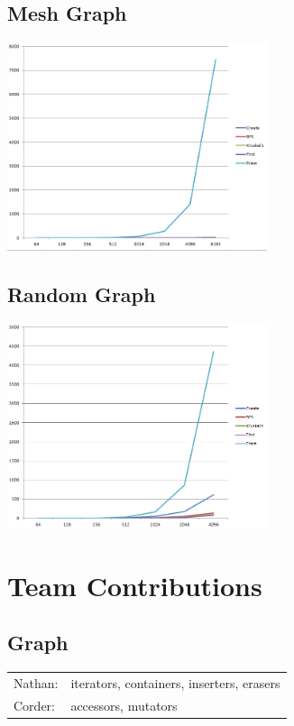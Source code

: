 \documentclass[titlepage]{article}
\newenvironment{Figure}
  {\par\medskip\noindent\minipage{\linewidth}}
  {\endminipage\par\medskip}
\begin{document}
\begin{multicols*}{2}
                \subsection{Mesh Graph}
                \begin{Figure}
                    \centering
                    \includegraphics[width=3in]{mesh}
                \end{Figure}

                \subsection{Random Graph}
                \begin{Figure}
                    \centering
                    \includegraphics[width=3in]{random}
                \end{Figure}

        \section{Team Contributions}
            \subsection{Graph}
                \begin{tabular}{l l}
                    Nathan: & iterators, containers, inserters, erasers \\
                    Corder: & accessors, mutators
                \end{tabular}

\end{multicols*}
\end{document}
